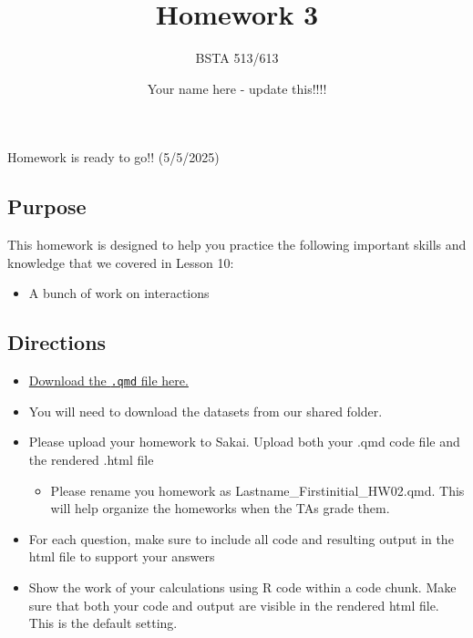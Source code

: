 \documentclass[
  letterpaper,
  DIV=11,
  numbers=noendperiod]{scrartcl}
\title{Homework 3}
\subtitle{BSTA 513/613}
\author{Your name here - update this!!!!}
\date{}
\providecommand{\tightlist}{%
  \setlength{\itemsep}{0pt}\setlength{\parskip}{0pt}}\usepackage{longtable,booktabs,array}
\begin{document}
\maketitle


\begin{tcolorbox}[enhanced jigsaw, titlerule=0mm, toprule=.15mm, colframe=quarto-callout-caution-color-frame, leftrule=.75mm, title=\textcolor{quarto-callout-caution-color}{\faFire}\hspace{0.5em}{Caution}, colbacktitle=quarto-callout-caution-color!10!white, rightrule=.15mm, toptitle=1mm, colback=white, bottomtitle=1mm, arc=.35mm, breakable, coltitle=black, bottomrule=.15mm, opacitybacktitle=0.6, opacityback=0, left=2mm]

Homework is ready to go!! (5/5/2025)

\end{tcolorbox}

\subsection{Purpose}\label{purpose}

This homework is designed to help you practice the following important
skills and knowledge that we covered in Lesson 10:

\begin{itemize}
\tightlist
\item
  A bunch of work on interactions
\end{itemize}

\subsection{Directions}\label{directions}

\begin{itemize}
\item
  \href{https://github.com/nwakim/BSTA_513_S25/blob/main/homework/HW_03.qmd}{Download
  the \texttt{.qmd} file here.}
\item
  You will need to download the datasets from our shared folder.
\item
  Please upload your homework to Sakai. Upload both your .qmd code file
  and the rendered .html file

  \begin{itemize}
  \tightlist
  \item
    Please rename you homework as Lastname\_Firstinitial\_HW02.qmd. This
    will help organize the homeworks when the TAs grade them.
  \end{itemize}
\item
  For each question, make sure to include all code and resulting output
  in the html file to support your answers
\item
  Show the work of your calculations using R code within a code chunk.
  Make sure that both your code and output are visible in the rendered
  html file. This is the default setting.
\end{itemize}
\end{document}
